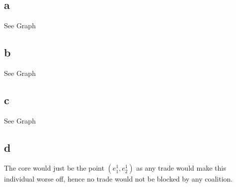\documentclass[11pt]{article}
\begin{document}
\section{}
\subsection*{a}
See Graph 
\subsection*{b}
See Graph 
\subsection*{c}
See Graph
\subsection*{d}
The core would just be the point $(e_1^1, e_2^1)$ as any trade would make this individual worse off, hence no trade would not be blocked by any coalition. 
\end{document}
